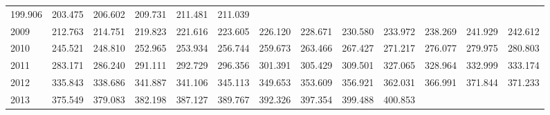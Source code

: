 \begin{tabular}{lllllllllllll}
  \multicolumn{1}{r}{199.906} &
  \multicolumn{1}{r}{203.475} &
  \multicolumn{1}{r}{206.602} &
  \multicolumn{1}{r}{209.731} &
  \multicolumn{1}{r}{211.481} &
  \multicolumn{1}{r}{211.039} \\
\multicolumn{1}{l}{\hspace{1em}2009} &
  \multicolumn{1}{|r}{212.763} &
  \multicolumn{1}{r}{214.751} &
  \multicolumn{1}{r}{219.823} &
  \multicolumn{1}{r}{221.616} &
  \multicolumn{1}{r}{223.605} &
  \multicolumn{1}{r}{226.120} &
  \multicolumn{1}{r}{228.671} &
  \multicolumn{1}{r}{230.580} &
  \multicolumn{1}{r}{233.972} &
  \multicolumn{1}{r}{238.269} &
  \multicolumn{1}{r}{241.929} &
  \multicolumn{1}{r}{242.612} \\
\multicolumn{1}{l}{\hspace{1em}2010} &
  \multicolumn{1}{|r}{245.521} &
  \multicolumn{1}{r}{248.810} &
  \multicolumn{1}{r}{252.965} &
  \multicolumn{1}{r}{253.934} &
  \multicolumn{1}{r}{256.744} &
  \multicolumn{1}{r}{259.673} &
  \multicolumn{1}{r}{263.466} &
  \multicolumn{1}{r}{267.427} &
  \multicolumn{1}{r}{271.217} &
  \multicolumn{1}{r}{276.077} &
  \multicolumn{1}{r}{279.975} &
  \multicolumn{1}{r}{280.803} \\
\multicolumn{1}{l}{\hspace{1em}2011} &
  \multicolumn{1}{|r}{283.171} &
  \multicolumn{1}{r}{286.240} &
  \multicolumn{1}{r}{291.111} &
  \multicolumn{1}{r}{292.729} &
  \multicolumn{1}{r}{296.356} &
  \multicolumn{1}{r}{301.391} &
  \multicolumn{1}{r}{305.429} &
  \multicolumn{1}{r}{309.501} &
  \multicolumn{1}{r}{327.065} &
  \multicolumn{1}{r}{328.964} &
  \multicolumn{1}{r}{332.999} &
  \multicolumn{1}{r}{333.174} \\
\multicolumn{1}{l}{\hspace{1em}2012} &
  \multicolumn{1}{|r}{335.843} &
  \multicolumn{1}{r}{338.686} &
  \multicolumn{1}{r}{341.887} &
  \multicolumn{1}{r}{341.106} &
  \multicolumn{1}{r}{345.113} &
  \multicolumn{1}{r}{349.653} &
  \multicolumn{1}{r}{353.609} &
  \multicolumn{1}{r}{356.921} &
  \multicolumn{1}{r}{362.031} &
  \multicolumn{1}{r}{366.991} &
  \multicolumn{1}{r}{371.844} &
  \multicolumn{1}{r}{371.233} \\
\multicolumn{1}{l}{\hspace{1em}2013} &
  \multicolumn{1}{|r}{375.549} &
  \multicolumn{1}{r}{379.083} &
  \multicolumn{1}{r}{382.198} &
  \multicolumn{1}{r}{387.127} &
  \multicolumn{1}{r}{389.767} &
  \multicolumn{1}{r}{392.326} &
  \multicolumn{1}{r}{397.354} &
  \multicolumn{1}{r}{399.488} &
  \multicolumn{1}{r}{400.853} &

\end{tabular}
